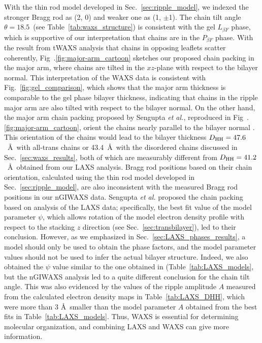 With the thin rod model developed in Sec.~\ref{sec:ripple_model}, we indexed 
the stronger Bragg rod as (2, 0) and weaker one as (1, $\pm$1). 
The chain tilt angle $\theta=18.5$\textdegree\
(see Table~\ref{tab:waxs_structure}) is consistent with the gel 
$L_{\beta F}$ phase, which is supportive of our interpretation that chains
are in the $P_{\beta F}$ phase.
With the result from tWAXS analysis that chains in opposing leaflets
scatter coherently, Fig~.\ref{fig:major-arm_cartoon} sketches
our proposed chain packing in the major arm, where
chains are tilted in the $xz$-plane with respect to the bilayer normal.
This interpretation of the WAXS data is consistent with 
Fig.~\ref{fig:gel_comparison}, 
which shows that the major arm thickness is 
comparable to the gel phase bilayer thickness, indicating that chains 
in the ripple major arm are also tilted with respect to the bilayer normal.
On the other hand, the major arm chain packing proposed by Sengupta \textit{et al.},
reproduced in Fig~.\ref{fig:major-arm_cartoon}, orient the chains
nearly parallel to the bilayer normal \cite{ref:Sengupta00,ref:Sengupta03}. 
This orientation of the chains would lead to the bilayer thickness $D_\textrm{HH}=47.6$~\AA\
with all-trans chains or 43.4~\AA\ with the disordered chains discussed in 
Sec.~\ref{sec:waxs_results}, both of which are 
measurably different from $D_\textrm{HH}=41.2$~\AA\ obtained from our LAXS analysis. 
Bragg rod positions based on their chain orientation, 
calculated using the thin rod model developed in Sec.~\ref{sec:ripple_model},
are also inconsistent with the measured Bragg rod positions in our nGIWAXS data.
Sengupta \textit{et al.} proposed the chain packing based on analysis of the 
LAXS data; specifically, the best fit value of the model parameter $\psi$,
which allows rotation of the model electron density profile with respect to 
the stacking $z$ direction (see Sec.~\ref{sec:transbilayer}), led to their conclusion. 
However, as we emphasized in Sec.~\ref{sec:LAXS_phases_results},
a model should only be used to obtain the phase factors, and the model parameter
values should not be used to infer the actual bilayer structure.
Indeed, we also obtained the $\psi$ value similar to the one obtained in \cite{ref:Sengupta03}
(Table~\ref{tab:LAXS_models},
but the nGIWAXS analysis led to a quite different conclusion for the chain tilt angle.
This was also evidenced by the values of the ripple amplitude $A$ measured 
from the calculated
electron density maps in Table~\ref{tab:LAXS_DHH}, which were more than
3 \AA\ smaller than the model parameter $A$ obtained from the best fits
in Table~\ref{tab:LAXS_models}.
Thus, WAXS is essential for determining molecular organization,
and combining LAXS and WAXS can give more information.

